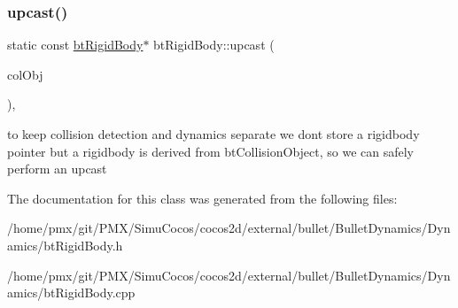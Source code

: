 \subsubsection{\texorpdfstring{upcast()}{upcast()}\hspace{0.1cm}{\footnotesize\ttfamily [2/2]}}
{\footnotesize\ttfamily static const \hyperlink{classbtRigidBody}{bt\+Rigid\+Body}$\ast$ bt\+Rigid\+Body\+::upcast (\begin{DoxyParamCaption}\item[{const bt\+Collision\+Object $\ast$}]{col\+Obj }\end{DoxyParamCaption})\hspace{0.3cm}{\ttfamily [inline]}, {\ttfamily [static]}}

to keep collision detection and dynamics separate we don\textquotesingle{}t store a rigidbody pointer but a rigidbody is derived from bt\+Collision\+Object, so we can safely perform an upcast 

The documentation for this class was generated from the following files\+:\begin{DoxyCompactItemize}
\item 
/home/pmx/git/\+P\+M\+X/\+Simu\+Cocos/cocos2d/external/bullet/\+Bullet\+Dynamics/\+Dynamics/bt\+Rigid\+Body.\+h\item 
/home/pmx/git/\+P\+M\+X/\+Simu\+Cocos/cocos2d/external/bullet/\+Bullet\+Dynamics/\+Dynamics/bt\+Rigid\+Body.\+cpp\end{DoxyCompactItemize}
